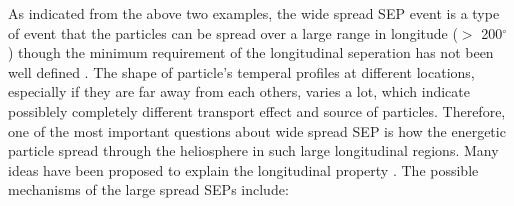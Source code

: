 As indicated from the above two examples, the wide spread \ac{SEP} event is a type of event that the particles can be spread over a large range in longitude ($>$ 200$^\circ$) though the minimum requirement of the longitudinal seperation has not been well defined \citep{Dresing_2014phd}. The shape of particle's temperal profiles at different locations, especially if they are far away from each others, varies a lot, which indicate possiblely completely different transport effect and source of particles. 
Therefore, one of the most important questions about wide spread \ac{SEP} is how the energetic particle spread through the heliosphere in such large longitudinal regions. Many ideas have been proposed to explain the longitudinal property \citep{Richardson2014SoPh, Dresing2012SoPh,Desai_Diacalone2016LRSP, Reames2021LNP}. The possible mechanisms of the large spread SEPs include:

